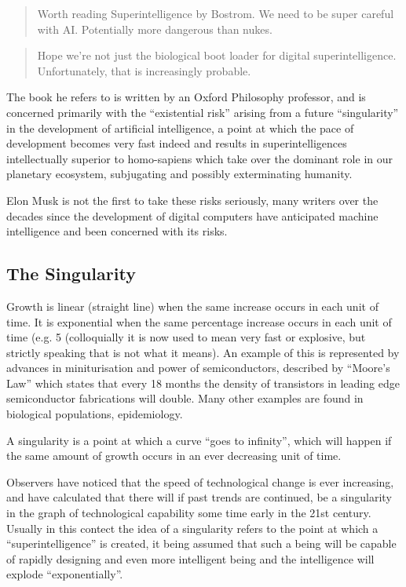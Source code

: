 \documentclass[12pt,titlepage]{article}
\begin{document}
\begin{quote}
Worth reading Superintelligence by Bostrom.
We need to be super careful with AI.
Potentially more dangerous than nukes.
\end{quote}

\begin{quote}
Hope we're not just the biological boot loader for digital superintelligence. Unfortunately, that is increasingly probable.
\end{quote}

The book he refers to is written by an Oxford Philosophy professor, and is concerned primarily with the ``existential risk'' arising from a future ``singularity'' in the development of artificial intelligence, a point at which the pace of development becomes very fast indeed and results in superintelligences intellectually superior to homo-sapiens which take over the dominant role in our planetary ecosystem, subjugating and possibly exterminating humanity.

Elon Musk is not the first to take these risks seriously, many writers over the decades since the development of digital computers have anticipated machine intelligence and been concerned with its risks.

\subsection{The Singularity}

Growth is linear (straight line) when the same increase occurs in each unit of time.
It is exponential when the same percentage increase occurs in each unit of time (e.g. 5%
(colloquially it is now used to mean very fast or explosive, but strictly speaking that is not what it means).
An example of this is represented by advances in miniturisation and power of semiconductors, described by ``Moore's Law'' which states that every 18 months the density of transistors in leading edge semiconductor fabrications will double.
Many other examples are found in biological populations, epidemiology.

A singularity is a point at which a curve ``goes to infinity'', which will happen if the same amount of growth occurs in an ever decreasing unit of time.

Observers have noticed that the speed of technological change is ever increasing, and have calculated that there will if past trends are continued, be a singularity in the graph of technological capability some time early in the 21st century.
Usually in this contect the idea of a singularity refers to the point at which a ``superintelligence'' is created, it being assumed that such a being will be capable of rapidly designing and even more intelligent being and the intelligence will explode ``exponentially''.
\end{document}
